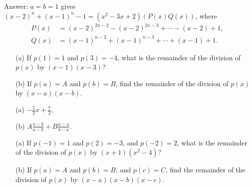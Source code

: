 \documentclass[12pt,a4paper]{memoir}
\theoremstyle{definition}
\begin{document}
\begin{solution}[name=Solution by Parviz Shahriari]
	Answer: $a=b=1$ gives $(x-2)^n+(x-1)^n-1 = (x^2-3x+2)\left(P(x)Q(x)\right)$, where
	\begin{align*}
		P(x) &= (x-2)^{2n-2} - (x-2)^{2n-3} + \cdots -(x-2)+1,\\
		Q(x) &= (x-1)^{n-2} + (x-1)^{n-3} + \cdots + (x-1) + 1.
	\end{align*}
\end{solution}





\begin{tcolorbox}
	\begin{question}
		\begin{itemize}
			\item[(a)] If $p(1)=1$ and $p(3)=-4$, what is the remainder of the division of $p(x)$ by $(x-1)(x-3)$?
			\item[(b)] If $p(a)=A$ and $p(b)=B$, find the remainder of the division of $p(x)$ by $(x-a)(x-b)$. 
		\end{itemize}
	\end{question}
\end{tcolorbox}

\begin{solution}[name=Solution by Parviz Shahriari]
	\begin{itemize}
		\item[(a)] $\displaystyle  -\frac{5}{2}x+\frac{7}{2}$,
		\item[(b)] $\displaystyle  A\frac{x-b}{a-b} + B\frac{x-a}{b-a}$.
	\end{itemize}
\end{solution}




\begin{tcolorbox}
	\begin{question}
		\begin{itemize}
			\item[(a)] If $p(-1)=1$ and $p(2)=-3$, and $p(-2)=2$, what is the remainder of the division of $p(x)$ by $(x+1)(x^2-4)$?
			\item[(b)] If $p(a)=A$ and $p(b)=B$, and $p(c)=C$, find the remainder of the division of $p(x)$ by $(x-a)(x-b)(x-c)$. 
		\end{itemize}
	\end{question}
\end{tcolorbox}
\end{document}
